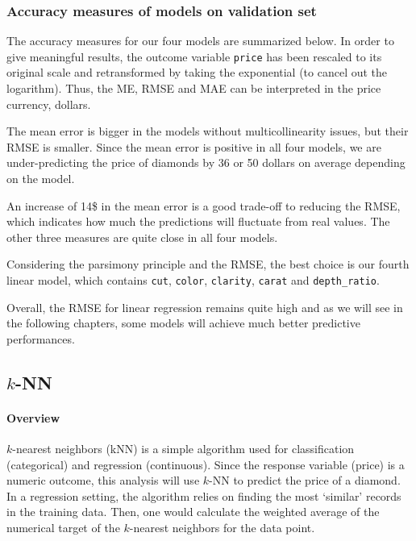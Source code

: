 \documentclass[
  paper=a4,
  ,captions=tableheading
]{scrartcl}
\begin{document}
\hypertarget{accuracy-measures-of-models-on-validation-set}{%
\subsubsection{Accuracy measures of models on validation
set}\label{accuracy-measures-of-models-on-validation-set}}

The accuracy measures for our four models are summarized below. In order
to give meaningful results, the outcome variable \texttt{price} has been
rescaled to its original scale and retransformed by taking the
exponential (to cancel out the logarithm). Thus, the ME, RMSE and MAE
can be interpreted in the price currency, dollars.

The mean error is bigger in the models without multicollinearity issues,
but their RMSE is smaller. Since the mean error is positive in all four
models, we are under-predicting the price of diamonds by 36 or 50
dollars on average depending on the model.

An increase of 14\$ in the mean error is a good trade-off to reducing
the RMSE, which indicates how much the predictions will fluctuate from
real values. The other three measures are quite close in all four
models.

Considering the parsimony principle and the RMSE, the best choice is our
fourth linear model, which contains \texttt{cut}, \texttt{color},
\texttt{clarity}, \texttt{carat} and \texttt{depth\_ratio}.

Overall, the RMSE for linear regression remains quite high and as we
will see in the following chapters, some models will achieve much better
predictive performances.

\hypertarget{k-nn}{%
\subsection{\texorpdfstring{\(k\)-NN}{k-NN}}\label{k-nn}}

\hypertarget{overview}{%
\paragraph{Overview}\label{overview}}

\(k\)-nearest neighbors (kNN) is a simple algorithm used for
classification (categorical) and regression (continuous). Since the
response variable (price) is a numeric outcome, this analysis will use
\(k\)-NN to predict the price of a diamond. In a regression setting, the
algorithm relies on finding the most `similar' records in the training
data. Then, one would calculate the weighted average of the numerical
target of the \(k\)-nearest neighbors for the data point.
\end{document}

